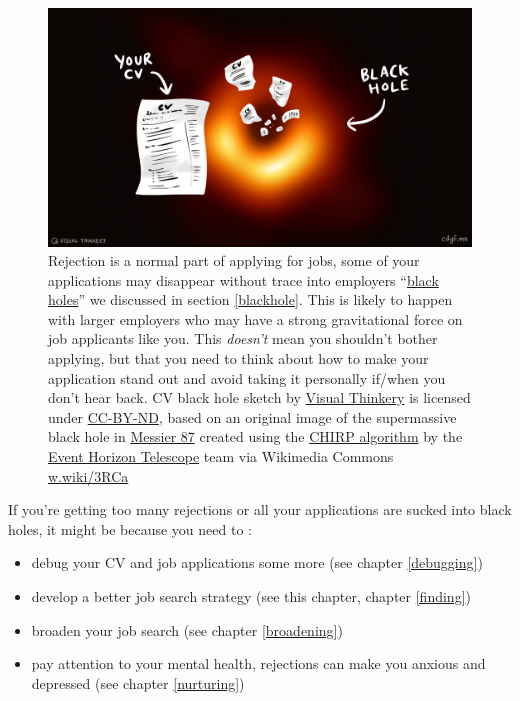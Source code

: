 \documentclass[
]{book}
\providecommand{\tightlist}{%
  \setlength{\itemsep}{0pt}\setlength{\parskip}{0pt}}
\begin{document}
\begin{figure}

{\centering \includegraphics[width=0.98\linewidth]{images/Black-hole-CV} 

}

\caption{Rejection is a normal part of applying for jobs, some of your applications may disappear without trace into employers ``\href{https://en.wikipedia.org/wiki/Black_hole}{black holes}'' we discussed in section \ref{blackhole}. This is likely to happen with larger employers who may have a strong gravitational force on job applicants like you. This \emph{doesn't} mean you shouldn't bother applying, but that you need to think about how to make your application stand out and avoid taking it personally if/when you don't hear back. CV black hole sketch by \href{https://visualthinkery.com/}{Visual Thinkery} is licensed under \href{https://creativecommons.org/licenses/by-nd/4.0/}{CC-BY-ND}, based on an original image of the supermassive black hole in \href{https://en.wikipedia.org/wiki/Messier_87}{Messier 87} created using the \href{https://en.wikipedia.org/wiki/CHIRP_(algorithm)}{CHIRP algorithm} by the \href{https://en.wikipedia.org/wiki/Event_Horizon_Telescope}{Event Horizon Telescope} team via Wikimedia Commons \href{https://w.wiki/3RCa}{w.wiki/3RCa}}\label{fig:blackhole-fig}
\end{figure}



If you're getting too many rejections or all your applications are sucked into black holes, it might be because you need to :

\begin{itemize}
\tightlist
\item
  debug your CV and job applications some more (see chapter \ref{debugging})
\item
  develop a better job search strategy (see this chapter, chapter \ref{finding})
\item
  broaden your job search (see chapter \ref{broadening})
\item
  pay attention to your mental health, rejections can make you anxious and depressed (see chapter \ref{nurturing})
\end{itemize}
\end{document}
